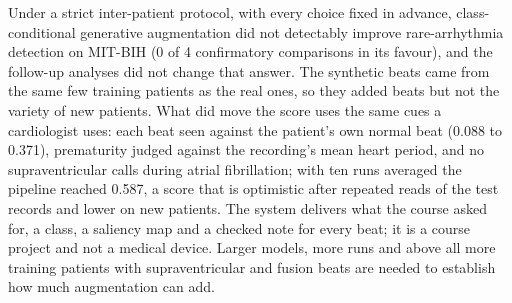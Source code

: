 Under a strict inter-patient protocol, with every choice fixed in advance, class-conditional generative augmentation did not detectably improve rare-arrhythmia detection on MIT-BIH (0 of 4 confirmatory comparisons in its favour), and the follow-up analyses did not change that answer. The synthetic beats came from the same few training patients as the real ones, so they added beats but not the variety of new patients. What did move the score uses the same cues a cardiologist uses: each beat seen against the patient's own normal beat (0.088 to 0.371), prematurity judged against the recording's mean heart period, and no supraventricular calls during atrial fibrillation; with ten runs averaged the pipeline reached 0.587, a score that is optimistic after repeated reads of the test records and lower on new patients. The system delivers what the course asked for, a class, a saliency map and a checked note for every beat; it is a course project and not a medical device. Larger models, more runs and above all more training patients with supraventricular and fusion beats are needed to establish how much augmentation can add.

